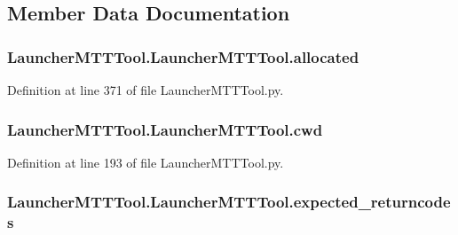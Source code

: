 \subsection{Member Data Documentation}
\hypertarget{class_launcher_m_t_t_tool_1_1_launcher_m_t_t_tool_a79266b94da58ec136cca44c1f735d3a7}{
\subsubsection[{allocated}]{\setlength{\rightskip}{0pt plus 5cm}Launcher\-M\-T\-T\-Tool.\-Launcher\-M\-T\-T\-Tool.\-allocated}}\label{class_launcher_m_t_t_tool_1_1_launcher_m_t_t_tool_a79266b94da58ec136cca44c1f735d3a7}


Definition at line 371 of file Launcher\-M\-T\-T\-Tool.\-py.

\hypertarget{class_launcher_m_t_t_tool_1_1_launcher_m_t_t_tool_a7bcf1056b03f3777ef4ed39f7e063f36}{
\subsubsection[{cwd}]{\setlength{\rightskip}{0pt plus 5cm}Launcher\-M\-T\-T\-Tool.\-Launcher\-M\-T\-T\-Tool.\-cwd}}\label{class_launcher_m_t_t_tool_1_1_launcher_m_t_t_tool_a7bcf1056b03f3777ef4ed39f7e063f36}


Definition at line 193 of file Launcher\-M\-T\-T\-Tool.\-py.

\hypertarget{class_launcher_m_t_t_tool_1_1_launcher_m_t_t_tool_ae68abb344ae827a5ce0ee79446020c63}{
\subsubsection[{expected\-\_\-returncodes}]{\setlength{\rightskip}{0pt plus 5cm}Launcher\-M\-T\-T\-Tool.\-Launcher\-M\-T\-T\-Tool.\-expected\-\_\-returncodes}}\label{class_launcher_m_t_t_tool_1_1_launcher_m_t_t_tool_ae68abb344ae827a5ce0ee79446020c63}


